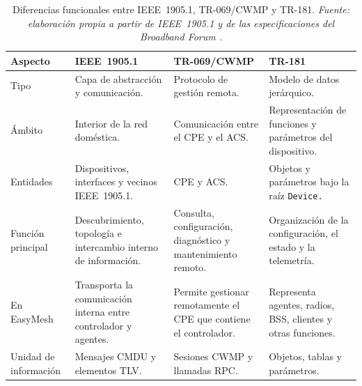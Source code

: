 \begin{table}[H]
    \centering
    \small
    \renewcommand{\arraystretch}{1.35}

    \caption[Diferencias entre IEEE~1905.1, TR-069/CWMP y TR-181.]
    {Diferencias funcionales entre IEEE~1905.1, TR-069/CWMP y TR-181.
    \textit{Fuente: elaboración propia a partir de IEEE~1905.1 y de las
    especificaciones del Broadband Forum
    \cite{ieee_1905_1,bbf_tr069,bbf_tr181}.}}

    \label{tab:diferencias-ieee1905-tr069-tr181}

    \begin{tabular}{
        p{}
        p{}
        p{}
        p{}
    }
        \hline
        \textbf{Aspecto}
        &
        \textbf{IEEE~1905.1}
        &
        \textbf{TR-069/CWMP}
        &
        \textbf{TR-181}
        \\
        \hline

        Tipo
        &
        Capa de abstracción y comunicación.
        &
        Protocolo de gestión remota.
        &
        Modelo de datos jerárquico.
        \\

        Ámbito
        &
        Interior de la red doméstica.
        &
        Comunicación entre el CPE y el ACS.
        &
        Representación de funciones y parámetros del dispositivo.
        \\

        Entidades
        &
        Dispositivos, interfaces y vecinos IEEE~1905.1.
        &
        CPE y ACS.
        &
        Objetos y parámetros bajo la raíz \texttt{Device.}
        \\

        Función principal
        &
        Descubrimiento, topología e intercambio interno de información.
        &
        Consulta, configuración, diagnóstico y mantenimiento remoto.
        &
        Organización de la configuración, el estado y la telemetría.
        \\

        En EasyMesh
        &
        Transporta la comunicación interna entre controlador y agentes.
        &
        Permite gestionar remotamente el CPE que contiene el controlador.
        &
        Representa agentes, radios, BSS, clientes y otras funciones.
        \\

        Unidad de información
        &
        Mensajes CMDU y elementos TLV.
        &
        Sesiones CWMP y llamadas RPC.
        &
        Objetos, tablas y parámetros.
        \\


\end{tabular}
\end{table}

